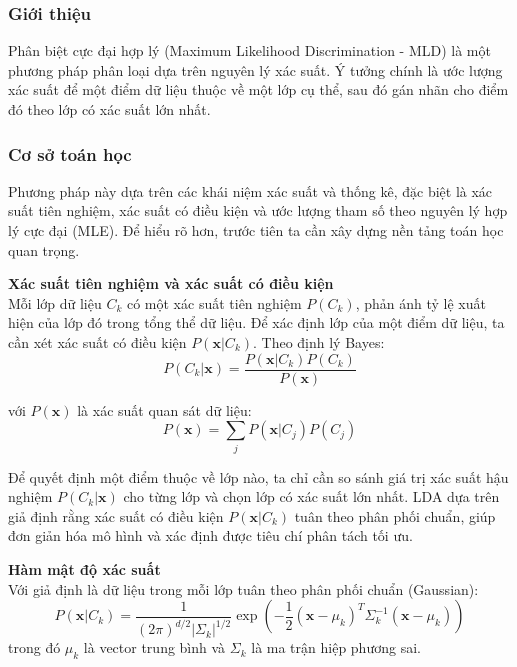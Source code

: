 \subsubsection{Giới thiệu}
 
Phân biệt cực đại hợp lý (Maximum Likelihood Discrimination - MLD) là một phương pháp phân loại dựa trên nguyên lý xác suất. Ý tưởng chính là ước lượng xác suất để một điểm dữ liệu thuộc về một lớp cụ thể, sau đó gán nhãn cho điểm đó theo lớp có xác suất lớn nhất.  

\subsubsection{Cơ sở toán học}
Phương pháp này dựa trên các khái niệm xác suất và thống kê, đặc biệt là xác suất tiên nghiệm, xác suất có điều kiện và ước lượng tham số theo nguyên lý hợp lý cực đại (MLE). Để hiểu rõ hơn, trước tiên ta cần xây dựng nền tảng toán học quan trọng.

\textbf{Xác suất tiên nghiệm và xác suất có điều kiện}  \\
Mỗi lớp dữ liệu $C_k$ có một xác suất tiên nghiệm $P(C_k)$, phản ánh tỷ lệ xuất hiện của lớp đó trong tổng thể dữ liệu. Để xác định lớp của một điểm dữ liệu, ta cần xét xác suất có điều kiện $P(\mathbf{x} | C_k)$. Theo định lý Bayes:
\begin{equation}\tag{2.2.1}
P(C_k | \mathbf{x}) = \frac{P(\mathbf{x} | C_k) P(C_k)}{P(\mathbf{x})}
\end{equation}

với $P(\mathbf{x})$ là xác suất quan sát dữ liệu:
\begin{equation}\tag{2.2.2}
P(\mathbf{x}) = \sum_{j} P(\mathbf{x} | C_j) P(C_j)
\end{equation}

Để quyết định một điểm thuộc về lớp nào, ta chỉ cần so sánh giá trị xác suất hậu nghiệm \( P(C_k | \mathbf{x}) \) cho từng lớp và chọn lớp có xác suất lớn nhất. LDA dựa trên giả định rằng xác suất có điều kiện \( P(\mathbf{x} | C_k) \) tuân theo phân phối chuẩn, giúp đơn giản hóa mô hình và xác định được tiêu chí phân tách tối ưu.

\textbf{Hàm mật độ xác suất}  \\
Với giả định là dữ liệu trong mỗi lớp tuân theo phân phối chuẩn (Gaussian):
\begin{equation}\tag{2.2.3}
P(\mathbf{x} | C_k) = \frac{1}{(2\pi)^{d/2} |\Sigma_k|^{1/2}} \exp\left( -\frac{1}{2} (\mathbf{x} - \mu_k)^T \Sigma_k^{-1} (\mathbf{x} - \mu_k) \right)
\end{equation}
trong đó $\mu_k$ là vector trung bình và $\Sigma_k$ là ma trận hiệp phương sai.

